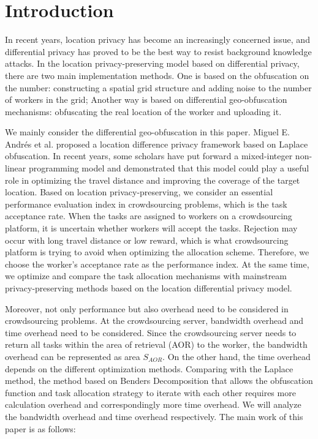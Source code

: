 \section{Introduction}

In recent years, location privacy has become an increasingly concerned issue, and differential privacy has proved to be the best way to resist background knowledge attacks. In the location privacy-preserving model based on differential privacy, there are two main implementation methods. One is based on the obfuscation on the number: constructing a spatial grid structure and adding noise to the number of workers in the grid; Another way is based on differential geo-obfuscation mechanisms: obfuscating the real location of the worker and uploading it.

We mainly consider the differential geo-obfuscation in this paper. Miguel E. Andrés et al. proposed a location difference privacy framework based on Laplace obfuscation. In recent years, some scholars have put forward a mixed-integer non-linear programming model and demonstrated that this model could play a useful role in optimizing the travel distance and improving the coverage of the target location.
Based on location privacy-preserving, we consider an essential performance evaluation index in crowdsourcing problems, which is the task acceptance rate. When the tasks are assigned to workers on a crowdsourcing platform, it is uncertain whether workers will accept the tasks. Rejection may occur with long travel distance or low reward, which is what crowdsourcing platform is trying to avoid when optimizing the allocation scheme. Therefore, we choose the worker's acceptance rate as the performance index. At the same time, we optimize and compare the task allocation mechanisms with mainstream privacy-preserving methods based on the location differential privacy model.

Moreover, not only performance but also overhead need to be considered in crowdsourcing problems. At the crowdsourcing server, bandwidth overhead and time overhead need to be considered. Since the crowdsourcing server needs to return all tasks within the area of retrieval (AOR) to the worker, the bandwidth overhead can be represented as area $S_{AOR}$. On the other hand, the time overhead depends on the different optimization methods. Comparing with the Laplace method, the method based on Benders Decomposition that allows the obfuscation function and task allocation strategy to iterate with each other requires more calculation overhead and correspondingly more time overhead. We will analyze the bandwidth overhead and time overhead respectively.
The main work of this paper is as follows:

